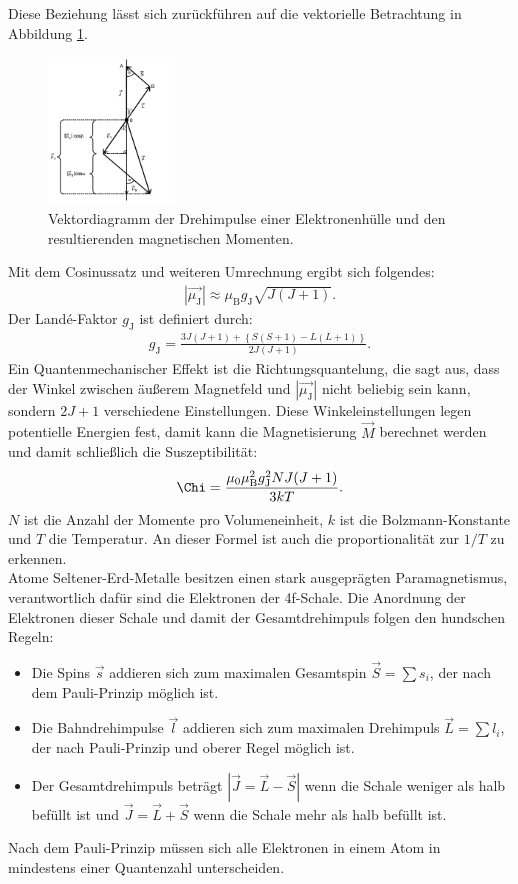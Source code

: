 Diese Beziehung lässt sich zurückführen auf die vektorielle Betrachtung
in Abbildung \ref{fig:winkel}.
\begin{figure}
 \centering
 \includegraphics[width=0.3\textwidth]{winkel.png}
 \caption{Vektordiagramm der Drehimpulse einer Elektronenhülle und den resultierenden magnetischen Momenten. }
 \label{fig:winkel}
 \end{figure}
Mit dem Cosinussatz und weiteren Umrechnung ergibt sich folgendes:
\begin{align}
 |\vec{\mu_\mathrm{J}}| \approx \mu_\mathrm{B} g_\mathrm{J} \sqrt{J(J+1)}.
\end{align}
Der Landé-Faktor $g_\mathrm{J}$ ist definiert durch:
\begin{align}
  g_\mathrm{J}=\frac{3J(J+1)+\left\{S(S+1)-L(L+1)\right\}}{2J(J+1)}.
\end{align}
Ein Quantenmechanischer Effekt ist die Richtungsquantelung,
die sagt aus, dass der Winkel zwischen äußerem Magnetfeld und
$|\vec{\mu_\mathrm{J}}|$  nicht beliebig sein kann, sondern $2J+1$
verschiedene Einstellungen. Diese Winkeleinstellungen legen potentielle Energien fest,
damit kann die Magnetisierung $\vec{M}$ berechnet werden und damit schließlich
die Suszeptibilität:
\begin{align}
  \Chi=\frac{\mu_0\mu_\mathrm{B}^2g_\mathrm{J}^2NJ(J+1)}{3kT}.\label{eqn:XT}
\end{align}
$N$ ist die Anzahl der Momente pro Volumeneinheit, $k$ ist die Bolzmann-Konstante und
$T$ die Temperatur. An dieser Formel ist auch die proportionalität zur $1/T$ zu erkennen.\\
Atome Seltener-Erd-Metalle besitzen einen stark ausgeprägten Paramagnetismus,
verantwortlich dafür sind die Elektronen der 4f-Schale. Die Anordnung der Elektronen dieser
Schale und damit der Gesamtdrehimpuls folgen den hundschen Regeln:
\begin{itemize}
  \item Die Spins $\vec{s}$ addieren sich zum maximalen Gesamtspin
   $\vec{S}=\sum s_i$, der nach dem Pauli-Prinzip möglich ist.
   \item Die Bahndrehimpulse $\vec{l}$ addieren sich zum maximalen Drehimpuls
   $\vec{L}=\sum l_i$, der nach Pauli-Prinzip und oberer Regel möglich ist.
   \item Der Gesamtdrehimpuls beträgt $|\vec{J}=\vec{L}-\vec{S}|$ wenn die
   Schale weniger als halb befüllt ist und $\vec{J}=\vec{L}+\vec{S}$ wenn die
   Schale mehr als halb befüllt ist.
\end{itemize}
Nach dem Pauli-Prinzip müssen sich alle Elektronen in einem Atom in mindestens
einer Quantenzahl unterscheiden.
